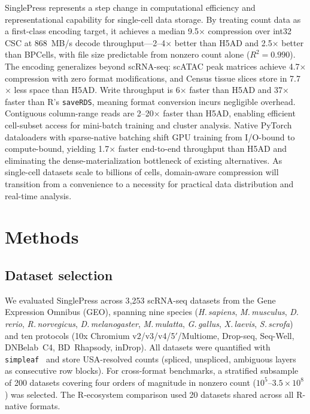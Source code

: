 \documentclass[10pt,twocolumn,letterpaper]{article}
\begin{document}
SinglePress represents a step change in computational efficiency and representational capability for single-cell data storage.
By treating count data as a first-class encoding target, it achieves a median 9.5$\times$ compression over int32 CSC at 868~MB/s decode throughput---2--4$\times$ better than H5AD and 2.5$\times$ better than BPCells, with file size predictable from nonzero count alone ($R^2 = 0.990$).
The encoding generalizes beyond scRNA-seq: scATAC peak matrices achieve 4.7$\times$ compression with zero format modifications, and Census tissue slices store in 7.7$\times$ less space than H5AD.
Write throughput is 6$\times$ faster than H5AD and 37$\times$ faster than R's \texttt{saveRDS}, meaning format conversion incurs negligible overhead.
Contiguous column-range reads are 2--20$\times$ faster than H5AD, enabling efficient cell-subset access for mini-batch training and cluster analysis.
Native PyTorch dataloaders with sparse-native batching shift GPU training from I/O-bound to compute-bound, yielding 1.7$\times$ faster end-to-end throughput than H5AD and eliminating the dense-materialization bottleneck of existing alternatives.
As single-cell datasets scale to billions of cells, domain-aware compression will transition from a convenience to a necessity for practical data distribution and real-time analysis.

\section{Methods}

\subsection{Dataset selection}

We evaluated SinglePress across 3{,}253 scRNA-seq datasets from the Gene Expression Omnibus (GEO), spanning nine species (\textit{H.\,sapiens}, \textit{M.\,musculus}, \textit{D.\,rerio}, \textit{R.\,norvegicus}, \textit{D.\,melanogaster}, \textit{M.\,mulatta}, \textit{G.\,gallus}, \textit{X.\,laevis}, \textit{S.\,scrofa}) and ten protocols (10x Chromium v2/v3/v4/5$'$/Multiome, Drop-seq, Seq-Well, DNBelab~C4, BD~Rhapsody, inDrop).
All datasets were quantified with \texttt{simpleaf}~\cite{he2022alevin} and store USA-resolved counts (spliced, unspliced, ambiguous layers as consecutive row blocks).
For cross-format benchmarks, a stratified subsample of 200 datasets covering four orders of magnitude in nonzero count ($10^5$--$3.5 \times 10^8$) was selected.
The R-ecosystem comparison used 20 datasets shared across all R-native formats.
\end{document}
